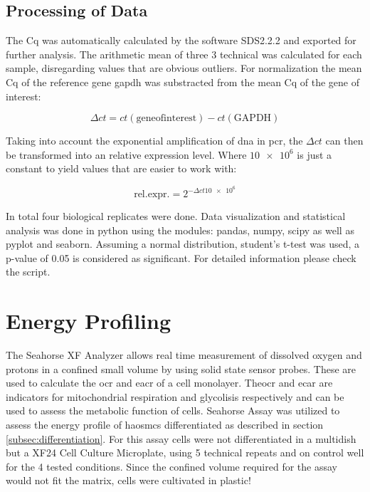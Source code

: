    \subsection{Processing of Data}
    The \ac{Cq} was automatically calculated by the software SDS2.2.2 and exported for further analysis. The arithmetic mean of three 3 technical was calculated for each sample, disregarding values that are obvious outliers. For normalization the mean \ac{Cq} of the reference gene \ac{gapdh} was substracted from the mean \ac{Cq} of the gene of interest:

    $$\Delta ct = ct(\mathrm{gene of interest}) - ct(\mathrm{GAPDH})$$

    Taking into account the exponential amplification of \ac{dna} in \ac{pcr}, the $\Delta ct$ can then be transformed into an relative expression level. Where $\num{10e6}$ is just a constant to yield values that are easier to work with:

    $$\mathrm{rel. expr.} = 2^{-\Delta ct\num{10e6}}$$

    In total four biological replicates were done. Data visualization and statistical analysis was done in python using the modules: pandas, numpy, scipy as well as pyplot and seaborn. Assuming a normal distribution, student's t-test was used, a p-value of 0.05 is considered as significant. For detailed information please check the script.

\section{Energy Profiling}
\label{sec:seahorse}
The Seahorse XF Analyzer allows real time measurement of dissolved oxygen and protons in a confined small volume by using solid state sensor probes. These are used to calculate the \ac{ocr} and \ac{eacr} of a cell monolayer. The\ac{ocr} and \ac{ecar} are indicators for mitochondrial respiration and glycolisis respectively and can be used to assess the metabolic function of cells. \cite{HowAgilentSeahorse} Seahorse Assay was utilized to assess the energy profile of \acp{haosmc} differentiated as described in section \ref{subsec:differentiation}. For this assay cells were not differentiated in a multidish but a XF24 Cell Culture Microplate, using 5 technical repeats and on control well for the 4 tested conditions. Since the confined volume required for the assay would not fit the matrix, cells were cultivated in plastic!


